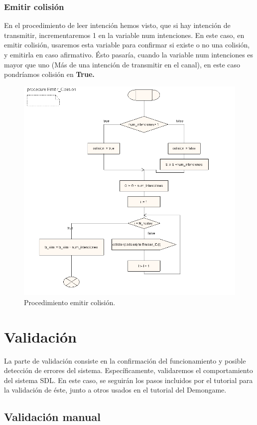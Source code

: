 \documentclass{article}
\begin{document}
\subsubsection{Emitir colisión}

En el procedimiento de leer intención hemos visto, que si hay intención de transmitir, incrementaremos 1 en la variable num intenciones. En este caso, en emitir colisión, usaremos esta variable para confirmar si existe o no una colisión, y emitirla en caso afirmativo. Ésto pasaría, cuando la variable num intenciones es mayor que uno (Más de una intención de transmitir en el canal), en este caso pondríamos colisión en \textbf{True.}


\begin{figure}[h]
    \centering
    \includegraphics[width=0.6\linewidth]{src/proc emitir col.png}
    \caption{\label{fig:emitircol} Procedimiento emitir colisión.}
\end{figure}

\section{Validación}

La parte de validación consiste en la confirmación del funcionamiento y posible detección de errores del sistema. Específicamente, validaremos el comportamiento del sistema SDL. En este caso, se seguirán los pasos incluidos por el tutorial para la validación de éste, junto a otros usados en el tutorial del Demongame.

\quad

\subsection{Validación manual}
\end{document}
